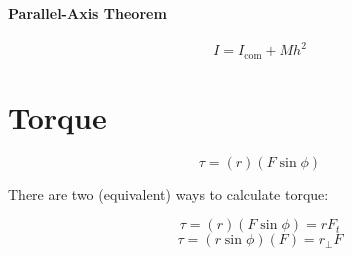 \documentclass{article}
\begin{document}
        \paragraph{Parallel-Axis Theorem}
        \begin{equation}
            I = I_\text{com} + M h^2
        \end{equation}

    \section{Torque}

        \begin{equation}
            \tau = \left( r \right) \left( F \sin{\phi} \right)
        \end{equation}

        There are two (equivalent) ways to calculate torque:

        \begin{equation}
            \tau = \left( r \right) \left( F \sin{\phi} \right) = r F_t
        \end{equation}
        \begin{equation}
            \tau = \left( r \sin{\phi} \right) \left( F \right) = r_\perp F
        \end{equation}
\end{document}
